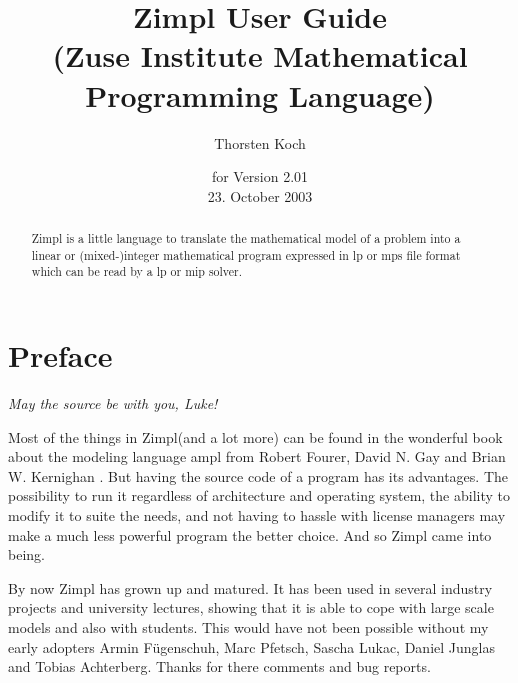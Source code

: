 \documentclass[12pt]{article}
\newcommand{\zimpl}{{\sc Zimpl}\xspace}
\newcommand{\lp}{{\sc lp}\xspace}
\newcommand{\mip}{{\sc mip}\xspace}
\newcommand{\mps}{{\sc mps}\xspace}
\newcommand{\lpf}{{\sc lp}\xspace}
\newcommand{\ampl}{{\sc ampl}\xspace}
\newcommand{\ilog}{{\sc ilog}\xspace}
\newcommand{\cplex}{{\sc cplex}\xspace}
\begin{document}

\title{
\LARGE\zimpl User Guide\\
\normalsize (Zuse Institute Mathematical Programming Language)}
\author{Thorsten Koch}
\date{\small for Version 2.01\\23. October 2003}
\maketitle
\vfill
\tableofcontents
\newpage
\begin{abstract}
\zimpl is a little language to translate the mathematical model of a 
problem into a linear or (mixed-)integer mathematical program
expressed in \lpf or \mps file format which can be read
by a \lp or \mip solver.
\end{abstract}
\section{Preface}
\begin{flushright}
{\em May the source be with you, Luke!}
\end{flushright}
Most of the things in \zimpl (and a lot more) can be found in 
the wonderful book about the modeling language \ampl 
from Robert Fourer, David N. Gay and Brian W. Kernighan
\cite{FourierGrayKernighan2003}.
But having the source code of a program has its advantages. The
possibility to run it regardless of architecture and operating system, the
ability to modify it to suite the needs, and not having to hassle with license
managers may make a much less powerful program the better choice.
And so \zimpl came into being.

\bigskip
By now \zimpl has grown up and matured. It has been used in several
industry projects and university lectures, showing that it is able to
cope with large scale models and also with students.
This would have not been possible without my early adopters 
Armin F\"ugenschuh, Marc Pfetsch, Sascha Lukac, Daniel Junglas
and Tobias Achterberg. Thanks for there comments and bug reports.
\end{document}
